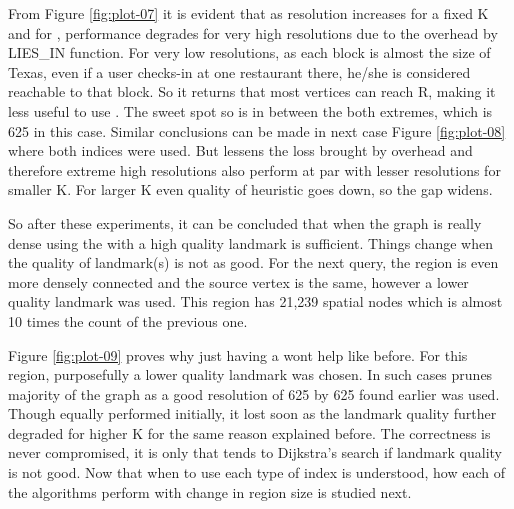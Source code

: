 From Figure \ref{fig:plot-07} it is evident that as resolution increases for a fixed K and for {\rrpspatial}, performance degrades for very high resolutions due to the overhead by LIES\_IN function. For very low resolutions, as each block is almost the size of Texas, even if a user checks-in at one restaurant there, he/she is considered reachable to that block. So it returns that most vertices can reach R, making it less useful to use {\rrpspatial}. The sweet spot so is in between the both extremes, which is 625 in this case. Similar conclusions can be made in next case Figure \ref{fig:plot-08} where both indices were used. But {\rrpsocial} lessens the loss brought by {\rrpspatial} overhead and therefore extreme high resolutions also perform at par with lesser resolutions for smaller K. For larger K even quality of heuristic goes down, so the gap widens.

So after these experiments, it can be concluded that when the graph is really dense using the {\rrpsocial} with a high quality landmark is sufficient. Things change when the quality of landmark(s) is not as good. For the next query, the region is even more densely connected and the source vertex is the same, however a lower quality landmark was used. This region has 21,239 spatial nodes which is almost 10 times the count of the previous one.

Figure \ref{fig:plot-09} proves why just having a {\rrpsocial} wont help like before. For this region, purposefully a lower quality landmark was chosen. In such cases {\rrpspatial} prunes majority of the graph as a good resolution of 625 by 625 found earlier was used. Though {\rrpsocial} equally performed {\rrp} initially, it lost soon as the landmark quality further degraded for higher K for the same reason explained before. The correctness is never compromised, it is only that {\rrp} tends to Dijkstra's search if landmark quality is not good. Now that when to use each type of index is understood, how each of the algorithms perform with change in region size is studied next.


